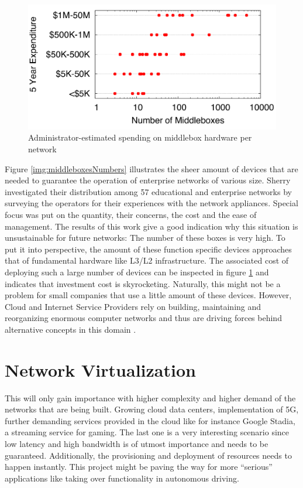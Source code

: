 \begin{figure}[h]
	\centering
	\includegraphics[width=1\linewidth]{images/middleboxesCost.png}
	\caption{Administrator-estimated spending on middlebox hardware per network \cite{sherry2016middleboxes}}
	\label{img:middleboxesCost}
\end{figure}

Figure \ref{img:middleboxesNumbers} illustrates the sheer amount of devices that are needed to guarantee the operation of enterprise networks of various size. Sherry \cite{sherry2012survey} \cite{sherry2016middleboxes} investigated their distribution among 57 educational and enterprise networks by surveying the operators for their experiences with the network appliances. Special focus was put on the quantity, their concerns, the cost and the ease of management. The results of this work give a good indication why this situation is unsustainable for future networks:  The number of these boxes is very high. To put it into perspective, the amount of these function specific devices approaches that of fundamental hardware like L3/L2 infrastructure. The associated cost of deploying such a large number of devices can be inspected in figure \ref{img:middleboxesCost} and indicates that investment cost is skyrocketing. Naturally, this might not be a problem for small companies that use a little amount of these devices. However, Cloud and Internet Service Providers rely on building, maintaining and reorganizing enormous computer networks and thus are driving forces behind alternative concepts in this domain \cite{sherry2016middleboxes} \cite{sherry2012survey}.


\section{Network Virtualization}
This will only gain importance with higher complexity and higher demand of the networks that are being built. Growing cloud data centers, implementation of 5G, further demanding services provided in the cloud like for instance Google Stadia, a streaming service for gaming. The last one is a very interesting scenario since low latency and high bandwidth is of utmost importance and needs to be guaranteed.  Additionally, the provisioning and deployment of resources needs to happen instantly. This project might be paving the way for more ``serious'' applications like taking over functionality in autonomous driving. 

